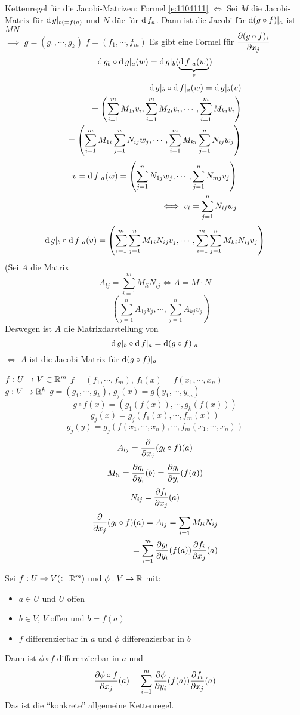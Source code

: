 \begin{Bem}
  Kettenregel für die Jacobi-Matrizen: Formel \ref{e:1104111} $\iff$ Sei $M$ die Jacobi-Matrix für $\operatorname{d} g|_{b(=f(a)}$ und $N$ düe für $\operatorname{d} f_a$. Dann ist die Jacobi für $\operatorname{d} (g\circ f)|_a$ ist $MN$ \\
  $\implies$ $g=(g_1,\cdots,g_k)$ $f=(f_1,\cdots,f_m)$ Es gibt eine Formel für $\dfrac{\partial (g\circ f)_i}{\partial x_j}$
  \[\operatorname{d} g_b\circ \operatorname{d} g|_a(w)=\operatorname{d} g|_b(\underbrace{\operatorname{d} f|_a(w)}_v)\]
  \begin{eqnarray*}
    \operatorname{d} g|_b\circ \operatorname{d} f|_a(w)=\operatorname{d} g|_b(v)\\
    =\left( \sum^m_{i=1}M_{1i}v_i,\sum^m_{i=1}M_{2i}v_i,\cdots,\sum^m_{i=1}M_{ki}v_i \right)\\
    =\left( \sum^m_{i=1}M_{1i}\sum^n_{j=1}N_{ij}w_j,\cdots,\sum^m_{i=1}M_{ki}\sum^n_{j=1}N_{ij}w_j \right)\\
  \end{eqnarray*}
  \begin{eqnarray*}
    v=\operatorname{d} f|_a(w)=\left( \sum^n_{j=1}N_{1j}w_j,\cdots,\sum^n_{j=1}N_{mj}v_j \right)\\
    \iff v_i=\sum^n_{j=1}N_{ij}w_j
  \end{eqnarray*}
  \[\operatorname{d} g|_b\circ \operatorname{d} f|_a(v)=\left( \sum^m_{i=1}\sum^n_{j=1}M_{1i}N_{ij}v_j,\cdots,\sum^m_{i=1}\sum^n_{j=1}M_{ki}N_{ij}v_j \right)\]
  (Sei $A$ die Matrix 
  \[A_{lj}=\sum_{i=1}^mM_{li}N_{ij} \iff A=M\cdot N\]
  \[=\left( \sum^n_{j=1}A_{1j}v_j,\cdots,\sum_{j=1}^nA_{kj}v_j \right)\]
  Deswegen ist $A$ die Matrixdarstellung von
  \[\operatorname{d} g|_b\circ \operatorname{d} f|_a=\operatorname{d} (g\circ f)|_a\]
  $\iff$ $A$ ist die Jacobi-Matrix für $\operatorname{d} (g\circ f)|_a$
\end{Bem}
\begin{Bem}
  $f:U\rightarrow V\subset\mathbb{R}^m$ $f=(f_1,\cdots,f_m)$, $f_i(x)=f(x_1,\cdots,x_n)$\\
  $g:V\rightarrow \mathbb{R}^k$ $g=(g_1,\cdots,g_k)$, $g_j(x)=g(y_1,\cdots,y_m)$\\
  \[g\circ f(x)=\left( g_1(f(x)),\cdots,g_k(f(x)) \right)\]
  \[g_j(x)=g_j(f_1(x),\cdots,f_m(x))\]
  \[g_j(y)=g_j(f(x_1,\cdots,x_n),\cdots,f_m(x_1,\cdots,x_n))\]
  \[A_{lj}=\dfrac{\partial }{\partial x_j}(g_l\circ f)(a)\]
  \[M_{li}=\dfrac{\partial g_l}{\partial y_i}(b)=\dfrac{\partial g_l}{\partial y_i}(f(a))\]
  \[N_{ij}=\dfrac{\partial f_i}{\partial x_j}(a)\]
  \begin{eqnarray*}
    \dfrac{\partial }{\partial x_j}(g_l\circ f)(a)=A_{lj}=\sum_{i=1}M_{li}N_{ij}\\
    =\sum_{i=1}^m\dfrac{\partial g_l}{\partial y_i}(f(a))\dfrac{\partial f_i}{\partial x_j}(a)
  \end{eqnarray*}
\end{Bem}
\begin{Kor}
  Sei $f:U\rightarrow V(\subset\mathbb{R}^m)$ und $\phi:V\rightarrow\mathbb{R}$ mit:
  \begin{itemize}
    \item $a\in U$ und $U$ offen
    \item $b\in V$, $V$ offen und $b=f(a)$
    \item $f$ differenzierbar in $a$ und $\phi$ differenzierbar in $b$
  \end{itemize}
  Dann ist $\phi\circ f$ differenzierbar in $a$ und
  \[\dfrac{\partial \phi\circ f}{\partial x_j}(a)=\sum_{i=1}^m\dfrac{\partial \phi}{\partial y_i}(f(a))\dfrac{\partial f_i}{\partial x_j}(a)\]
  Das ist die ``konkrete'' allgemeine Kettenregel.
\end{Kor}
